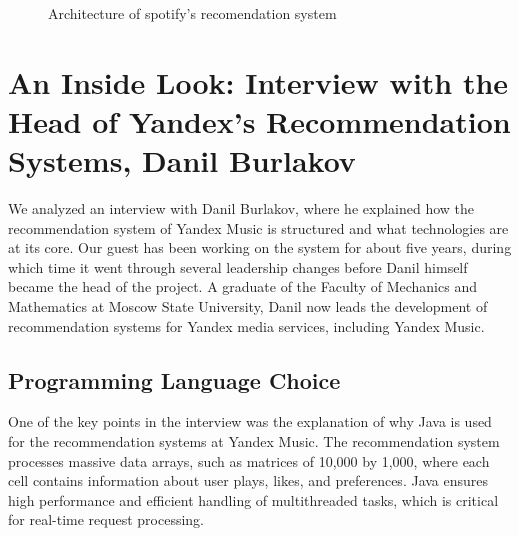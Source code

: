\documentclass[12pt,a4paper]{article}
\begin{document}
\begin{figure}
\begin{center}
\end{center}
\caption{Architecture of spotify's recomendation system}
\label{Schema2}
\end{figure}

\section{An Inside Look: Interview with the Head of Yandex's Recommendation Systems, Danil Burlakov}

    We analyzed an interview with Danil Burlakov, where he explained how the recommendation system of Yandex Music is structured and what technologies are at its core. Our guest has been working on the system for about five years, during which time it went through several leadership changes before Danil himself became the head of the project. A graduate of the Faculty of Mechanics and Mathematics at Moscow State University, Danil now leads the development of recommendation systems for Yandex media services, including Yandex Music\citep{YandexI}.

\subsection{Programming Language Choice}

One of the key points in the interview was the explanation of why Java is used for the recommendation systems at Yandex Music. The recommendation system processes massive data arrays, such as matrices of 10,000 by 1,000, where each cell contains information about user plays, likes, and preferences. Java ensures high performance and efficient handling of multithreaded tasks, which is critical for real-time request processing\citep{YT}.
\end{document}
